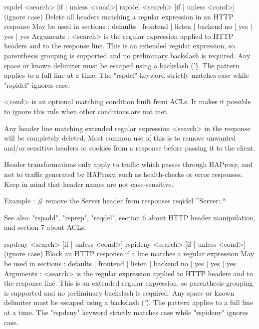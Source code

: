 rspdel  <search> [{if | unless} <cond>]
rspidel <search> [{if | unless} <cond>]  (ignore case)
  Delete all headers matching a regular expression in an HTTP response
  May be used in sections :   defaults | frontend | listen | backend
                                 no    |    yes   |   yes  |   yes
  Arguments :
    <search>  is the regular expression applied to HTTP headers and to the
              response line. This is an extended regular expression, so
              parenthesis grouping is supported and no preliminary backslash
              is required. Any space or known delimiter must be escaped using
              a backslash ('\'). The pattern applies to a full line at a time.
              The "rspdel" keyword strictly matches case while "rspidel"
              ignores case.

    <cond>    is an optional matching condition built from ACLs. It makes it
              possible to ignore this rule when other conditions are not met.

  Any header line matching extended regular expression <search> in the response
  will be completely deleted. Most common use of this is to remove unwanted
  and/or sensitive headers or cookies from a response before passing it to the
  client.

  Header transformations only apply to traffic which passes through HAProxy,
  and not to traffic generated by HAProxy, such as health-checks or error
  responses. Keep in mind that header names are not case-sensitive.

  Example :
     # remove the Server header from responses
     reqidel ^Server:.*

  See also: "rspadd", "rsprep", "reqdel", section 6 about HTTP header
            manipulation, and section 7 about ACLs.


rspdeny  <search> [{if | unless} <cond>]
rspideny <search> [{if | unless} <cond>]  (ignore case)
  Block an HTTP response if a line matches a regular expression
  May be used in sections :   defaults | frontend | listen | backend
                                 no    |    yes   |   yes  |   yes
  Arguments :
    <search>  is the regular expression applied to HTTP headers and to the
              response line. This is an extended regular expression, so
              parenthesis grouping is supported and no preliminary backslash
              is required. Any space or known delimiter must be escaped using
              a backslash ('\'). The pattern applies to a full line at a time.
              The "rspdeny" keyword strictly matches case while "rspideny"
              ignores case.

